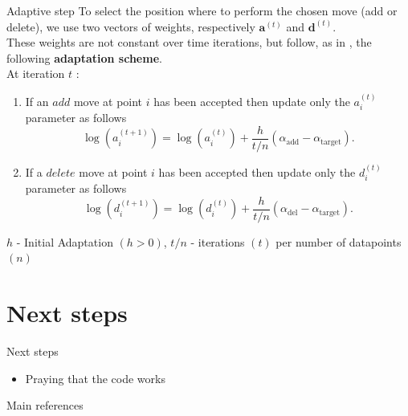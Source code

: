 \begin{frame}{Adaptive step}
    To select the position where to perform the chosen move (add or delete), we use two vectors of weights, respectively $\bm{a}^{(t)}$
    and $\bm{d}^{(t)}$. \\
    These weights are not constant over time iterations, but follow, as in \cite{bensonAdaptiveMCMCMultiple2018}, the following 
    \textbf{adaptation scheme}.\\

    At iteration $t$ :
    \begin{enumerate}
        \item If an $add$ move at point $i$ has been accepted then update only the $a_i^{(t)}$ parameter as follows
		\[
		\log (a_i^{(t+1)})=\log (a_i^{(t)})+\frac{h}{t / n}(\alpha_{\text{add}}-\alpha_{\text{target}}) .
		\]
        \item If a $delete$ move at point $i$ has been accepted then update only the $d_i^{(t)}$ parameter as follows
		\[
		\log (d_i^{(t+1)})=\log (d_i^{(t)})+\frac{h}{t / n}(\alpha_{\text{del}}-\alpha_{\text{target}}) .
		\]
        \end{enumerate}
$h$ - Initial Adaptation $(h>0)$,
$t / n$ - iterations $(t)$ per number of datapoints $(n)$

\end{frame}



\section{Next steps}
\begin{frame}{Next steps}

    \begin{itemize}
        \item Praying that the code works
    \end{itemize}



\end{frame}




\begin{frame}{Main references}
    \nocite{colombiLearningBlockStructured2022a}
    \nocite{mohammadiBayesianStructureLearning2015a}
    \nocite{legramantiExtendedStochasticBlock2022}
    \nocite{bensonAdaptiveMCMCMultiple2018}
    \nocite{martinezNonparametricChangePoint2014}
    
    
    \printbibliography
    \renewcommand*{\bibfont}{\small}
\end{frame}



